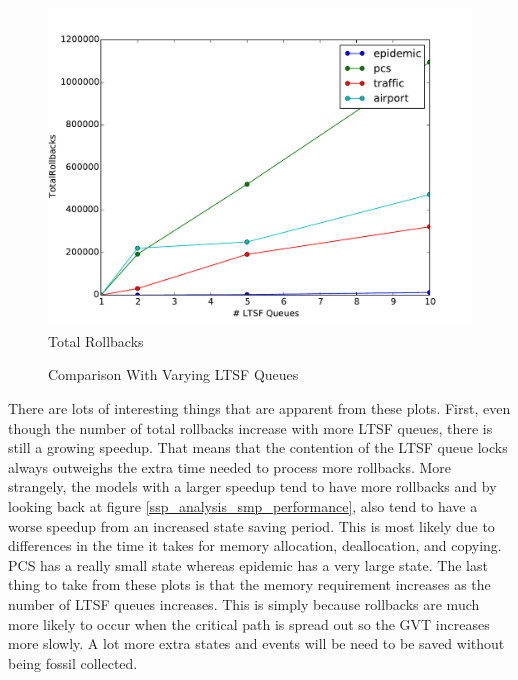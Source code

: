 \documentclass[11pt]{book}
\begin{document}
\begin{figure}
\begin{minipage}{.5\textwidth}
  \end{minipage}%
  \hfill
  \begin{minipage}{.5\textwidth}
    \begin{center}
      \includegraphics[width=\textwidth,keepaspectratio,quiet]{figs/pending_event_set/ltsf_rollbacks.pdf} \\
      Total Rollbacks \\
    \end{center}
  \end{minipage}
  \caption{Comparison With Varying LTSF Queues}\label{ltsf_analysis}
\end{figure}

There are lots of interesting things that are apparent from these plots. First, even though
the number of total rollbacks increase with more LTSF queues, there is still a growing speedup.
That means that the contention of the LTSF queue locks always outweighs the extra time needed
to process more rollbacks. More strangely, the models with a larger speedup tend to have more
rollbacks and by looking back at figure \ref{ssp_analysis_smp_performance}, also tend to have a worse speedup
from an increased state saving period. This is most likely due to differences in the time it
takes for memory allocation, deallocation, and copying. PCS has a really small state whereas
epidemic has a very large state. The last thing to take from these plots is that the memory
requirement increases as the number of LTSF queues increases. This is simply because rollbacks
are much more likely to occur when the critical path is spread out so the GVT increases more
slowly. A lot more extra states and events will be need to be saved without being fossil collected.
\end{document}
